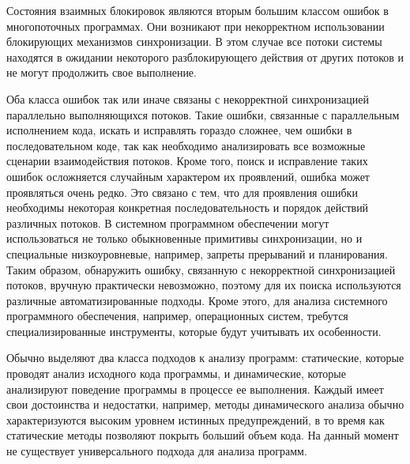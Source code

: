  
Состояния взаимных блокировок являются вторым большим классом ошибок в многопоточных программах.
Они возникают при некорректном использовании блокирующих механизмов синхронизации.
В этом случае все потоки системы находятся в ожидании некоторого разблокирующего действия от других потоков и не могут продолжить свое выполнение. 

Оба класса ошибок так или иначе связаны с некорректной синхронизацией параллельно выполняющихся потоков.
Такие ошибки, связанные с параллельным исполнением кода, искать и исправлять гораздо сложнее, чем ошибки в последовательном коде, так как необходимо анализировать все возможные сценарии взаимодействия потоков.
Кроме того, поиск и исправление таких ошибок осложняется случайным характером их проявлений, ошибка может проявляться очень редко.
Это связано с тем, что для проявления ошибки необходимы некоторая конкретная последовательность и порядок действий различных потоков. 
В системном программном обеспечении могут использоваться не только обыкновенные примитивы синхронизации, но и специальные низкоуровневые, например, запреты прерываний и планирования. 
Таким образом, обнаружить ошибку, связанную с некорректной синхронизацией потоков, вручную практически невозможно, поэтому для их поиска используются различные автоматизированные подходы.
Кроме этого, для анализа системного программного обеспечения, например, операционных систем, требутся специализированные инструменты, которые будут учитывать их особенности.

Обычно выделяют два класса подходов к анализу программ: статические, которые проводят анализ исходного кода программы, и динамические, которые анализируют поведение программы в процессе ее выполнения.
Каждый имеет свои достоинства и недостатки, например, методы динамического анализа обычно характеризуются высоким уровнем истинных предупреждений, в то время как статические методы позволяют покрыть больший объем кода.
На данный момент не существует универсального подхода для анализа программ.


